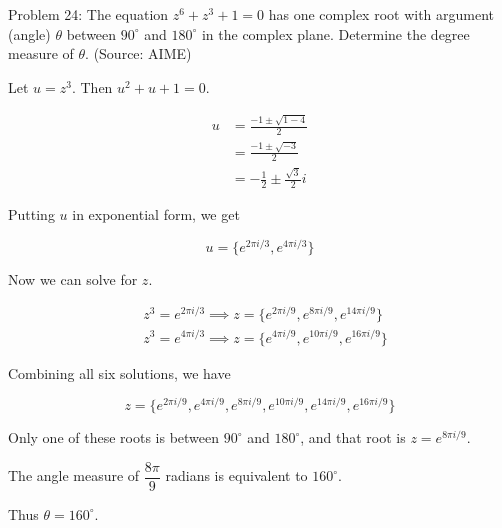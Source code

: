 Problem 24: The equation $z^6 + z^3 + 1 = 0$ has one complex root with argument (angle) $\theta$ between $90^\circ$ and $180^\circ$ in the complex plane. Determine the degree measure of $\theta$. (Source: AIME)

Let $u = z^3$. Then $u^2 + u + 1 = 0$.

\begin{align*}
u &= \frac{-1 \pm \sqrt{1 - 4}}{2} \\
&= \frac{-1 \pm \sqrt{-3}}{2} \\
&= -\frac{1}{2} \pm \frac{\sqrt 3}{2}i
\end{align*}

Putting $u$ in exponential form, we get

$$ u = \{e^{2 \pi i / 3}, e^{4 \pi i / 3}\} $$

Now we can solve for $z$.

\begin{align*}
& z^3 = e^{2 \pi i / 3}
\implies z = \{e^{2 \pi i / 9}, e^{8 \pi i / 9}, e^{14 \pi i / 9}\} \\
& z^3 = e^{4 \pi i / 3}
\implies z = \{e^{4 \pi i / 9}, e^{10 \pi i / 9}, e^{16 \pi i / 9}\}
\end{align*}

Combining all six solutions, we have

$$ z = \{e^{2 \pi i / 9}, e^{4 \pi i / 9}, e^{8 \pi i / 9}, e^{10 \pi i / 9}, e^{14 \pi i / 9}, e^{16 \pi i / 9}\} $$

Only one of these roots is between $90^{\circ}$ and $180^{\circ}$, and that root is $z = e^{8 \pi i / 9}$.

The angle measure of $\dfrac{8\pi}{9}$ radians is equivalent to $160^{\circ}$.

Thus $\boxed{\theta = 160^{\circ}}$.
